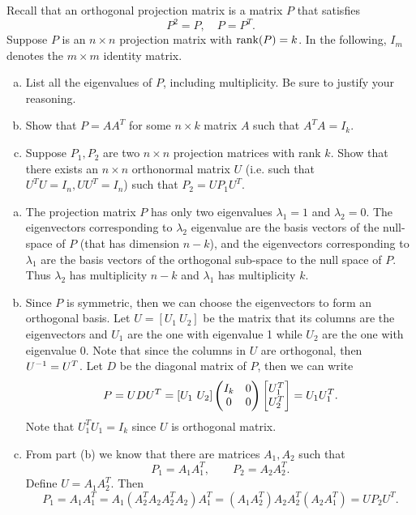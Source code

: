 \begin{problem}
	Recall that an orthogonal projection matrix is a matrix $ P $ that satisfies 
	\[ P^2 = P, \quad P = P^T. \]
	Suppose $ P $ is an $ n\times n $ projection matrix with $ \rank(P) = k $. In the following, $ I_m $ denotes the $ m\times m $ identity matrix. 
	
	\begin{enumerate}[(a)]
		\item List all the eigenvalues of $ P $, including multiplicity. Be sure to justify your reasoning.
		\item Show that $ P = AA^T $ for some $ n\times k $ matrix $ A $ such that $ A^TA = I_k $.
		\item Suppose $ P_1, P_2 $ are two $ n\times n $ projection matrices with rank $ k $. Show that there exists an $ n\times n $ orthonormal matrix $ U $ (i.e. such that $ U^T U = I_n, UU^T = I_n$) such that $ P_2 = UP_1 U^T $.
	\end{enumerate}
\end{problem}
\begin{solution}
	\begin{enumerate}[(a)]
		\item The projection matrix $ P $ has only two eigenvalues $ \lambda_1 = 1 $ and $ \lambda_2 = 0 $. The eigenvectors corresponding to $ \lambda_2 $ eigenvalue are the basis vectors of the null-space of $ P $ (that has dimension $ n - k $), and the eigenvectors corresponding to $ \lambda_1 $ are the basis vectors of the orthogonal sub-space to the null space of $ P $. Thus $ \lambda_2 $ has multiplicity $ n-k $ and $ \lambda_1 $ has multiplicity $ k $. 
		
		\item Since $ P $ is symmetric, then we can choose the eigenvectors to form an orthogonal basis. Let $ U = [U_1\ U_2] $ be the matrix that its columns are the eigenvectors and $ U_1 $ are the one with eigenvalue 1 while $ U_2 $ are the one with eigenvalue 0. Note that since the columns in $ U $ are orthogonal, then $ U^{-1} = U^T $. Let $ D $ be the diagonal matrix of $ P $, then we can write
		\[ P = U D U^T = [U_1\ U_2] \begin{pmatrix} I_k & 0 \\ 0 & 0 \end{pmatrix} \begin{bmatrix} U_1^T \\ U_2^T \end{bmatrix} = U_1 U_1^T. \]
		Note that $ U_1^T U_1  = I_k$ since $ U $ is orthogonal matrix.
		
		\item From part (b) we know that there are matrices $ A_1, A_2 $ such that 
		\[ P_1 = A_1A_1^T,\qquad P_2 = A_2A_2^T. \]
		Define $ U = A_1A_2^T $. Then
		\[ P_1 = A_1A_1^T = A_1 (A_2^TA_2 A_2^T A_2) A_1^T = (A_1A_2^T) A_2A_2^T (A_2A_1^T) = U P_2 U^T. \]
	\end{enumerate}
\end{solution}


